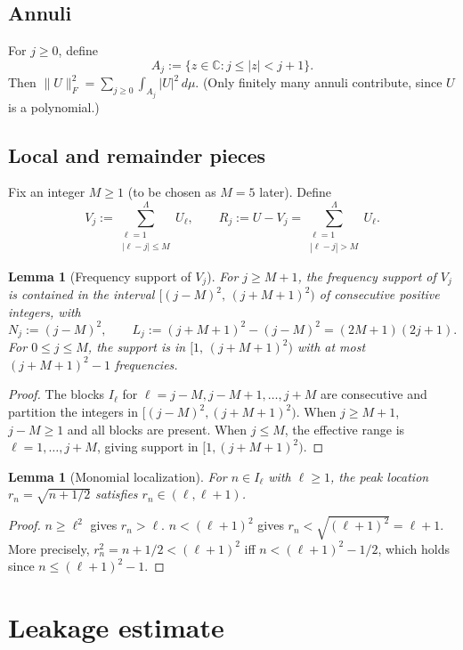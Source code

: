 \documentclass[11pt]{article}
\newtheorem{lemma}[theorem]{Lemma}
\newcommand{\norm}[1]{\lVert #1\rVert}
\newcommand{\abs}[1]{\lvert #1\rvert}
\begin{document}
\subsection{Annuli}
For $j \ge 0$, define
\[
  A_j := \{z \in \mathbb{C} : j \le |z| < j+1\}.
\]
Then $\norm{U}_F^2 = \sum_{j\ge 0}\int_{A_j}|U|^2\,d\mu$.
(Only finitely many annuli contribute, since $U$ is a polynomial.)

\subsection{Local and remainder pieces}
Fix an integer $M \ge 1$ (to be chosen as $M = 5$ later). Define
\[
  V_j := \sum_{\substack{\ell=1\\\abs{\ell-j}\le M}}^{\Lambda}U_\ell,
  \qquad
  R_j := U - V_j = \sum_{\substack{\ell=1\\|\ell-j|>M}}^{\Lambda}U_\ell.
\]

\begin{lemma}[Frequency support of $V_j$]\label{lem:Vj-support}
For $j \ge M+1$, the frequency support of $V_j$ is contained in the interval
$[(j-M)^2,\,(j+M+1)^2)$ of consecutive positive integers, with
\[
  N_j := (j-M)^2, \qquad L_j := (j+M+1)^2 - (j-M)^2 = (2M+1)(2j+1).
\]
For $0 \le j \le M$, the support is in $[1,\,(j+M+1)^2)$ with at most $(j+M+1)^2-1$ frequencies.
\end{lemma}
\begin{proof}
The blocks $I_\ell$ for $\ell = j-M, j-M+1, \ldots, j+M$ are consecutive and partition
the integers in $[(j-M)^2, (j+M+1)^2)$.
When $j \ge M+1$, $j-M \ge 1$ and all blocks are present.
When $j \le M$, the effective range is $\ell = 1, \ldots, j+M$,
giving support in $[1, (j+M+1)^2)$.
\end{proof}

\begin{lemma}[Monomial localization]\label{lem:monomial-loc}
For $n \in I_\ell$ with $\ell \ge 1$, the peak location $r_n = \sqrt{n+1/2}$
satisfies $r_n \in (\ell, \ell+1)$.
\end{lemma}
\begin{proof}
$n \ge \ell^2$ gives $r_n > \ell$. $n < (\ell+1)^2$ gives
$r_n < \sqrt{(\ell+1)^2} = \ell+1$.
More precisely, $r_n^2 = n+1/2 < (\ell+1)^2$
iff $n < (\ell+1)^2 - 1/2$, which holds since $n \le (\ell+1)^2-1$.
\end{proof}

\section{Leakage estimate}\label{sec:leakage}
\end{document}
